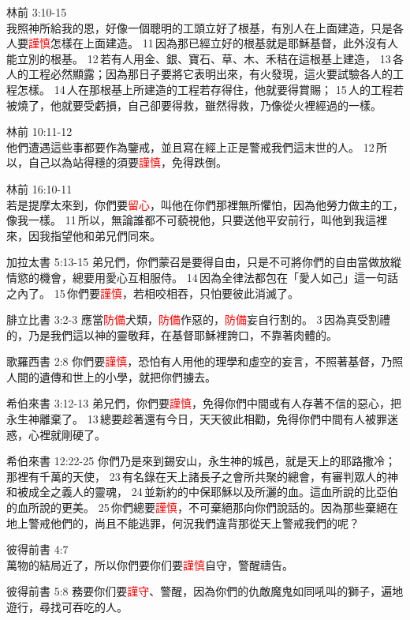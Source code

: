 林前 3:10-15\\
我照神所給我的恩，好像一個聰明的工頭立好了根基，有別人在上面建造，只是各人要\textcolor{red}{謹慎}怎樣在上面建造。 11 因為那已經立好的根基就是耶穌基督，此外沒有人能立別的根基。 12 若有人用金、銀、寶石、草、木、禾秸在這根基上建造， 13 各人的工程必然顯露；因為那日子要將它表明出來，有火發現，這火要試驗各人的工程怎樣。 14 人在那根基上所建造的工程若存得住，他就要得賞賜； 15 人的工程若被燒了，他就要受虧損，自己卻要得救，雖然得救，乃像從火裡經過的一樣。

林前 10:11-12\\
他們遭遇這些事都要作為鑒戒，並且寫在經上正是警戒我們這末世的人。 12 所以，自己以為站得穩的須要\textcolor{red}{謹慎}，免得跌倒。

林前 16:10-11\\
若是提摩太來到，你們要\textcolor{red}{留心}，叫他在你們那裡無所懼怕，因為他勞力做主的工，像我一樣。 11 所以，無論誰都不可藐視他，只要送他平安前行，叫他到我這裡來，因我指望他和弟兄們同來。

加拉太書 5:13-15
弟兄們，你們蒙召是要得自由，只是不可將你們的自由當做放縱情慾的機會，總要用愛心互相服侍。 14 因為全律法都包在「愛人如己」這一句話之內了。 15 你們要\textcolor{red}{謹慎}，若相咬相吞，只怕要彼此消滅了。

腓立比書 3:2-3
應當\textcolor{red}{防備}犬類，\textcolor{red}{防備}作惡的，\textcolor{red}{防備}妄自行割的。 3 因為真受割禮的，乃是我們這以神的靈敬拜，在基督耶穌裡誇口，不靠著肉體的。

歌羅西書 2:8
你們要\textcolor{red}{謹慎}，恐怕有人用他的理學和虛空的妄言，不照著基督，乃照人間的遺傳和世上的小學，就把你們擄去。

希伯來書 3:12-13
弟兄們，你們要\textcolor{red}{謹慎}，免得你們中間或有人存著不信的惡心，把永生神離棄了。 13 總要趁著還有今日，天天彼此相勸，免得你們中間有人被罪迷惑，心裡就剛硬了。

希伯來書 12:22-25
你們乃是來到錫安山，永生神的城邑，就是天上的耶路撒冷；那裡有千萬的天使， 23 有名錄在天上諸長子之會所共聚的總會，有審判眾人的神和被成全之義人的靈魂， 24 並新約的中保耶穌以及所灑的血。這血所說的比亞伯的血所說的更美。 25 你們總要\textcolor{red}{謹慎}，不可棄絕那向你們說話的。因為那些棄絕在地上警戒他們的，尚且不能逃罪，何況我們違背那從天上警戒我們的呢？

彼得前書 4:7\\
萬物的結局近了，所以你們要你们要\textcolor{red}{謹慎}自守，警醒禱告。

彼得前書 5:8
務要你们要\textcolor{red}{謹守}、警醒，因為你們的仇敵魔鬼如同吼叫的獅子，遍地遊行，尋找可吞吃的人。

